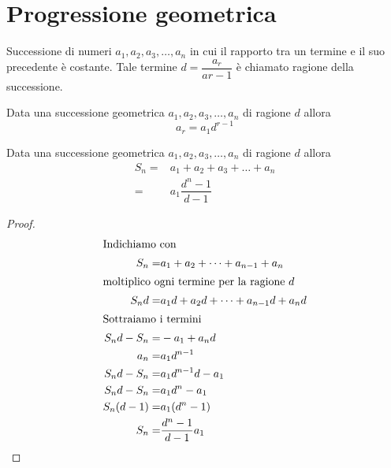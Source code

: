 \section{Progressione geometrica}
\begin{defn}\label{defn:ProgGeom1}
		Successione di numeri $a_1,a_2,a_3,\dots,a_n$ in cui il rapporto tra un termine e il suo precedente è costante. Tale termine $d=\dfrac{a_r}{a{r-1}}$ è chiamato ragione della successione.
\end{defn}
\begin{prop}
	Data una successione geometrica $a_1,a_2,a_3,\dots,a_n$ di ragione $d$ allora\[a_r=a_1d^{r-1}\]
\end{prop}
\begin{thm}\label{thm:SommaProgGeo}
		Data una successione geometrica $a_1,a_2,a_3,\dots,a_n$ di ragione $d$ allora 
		\begin{align*}
			S_n=&a_1+a_2+a_3+\dots+a_n\\
			=&a_1\dfrac{d^n-1}{d-1}
		\end{align*}
\end{thm}
\begin{proof}
\begin{align*}
\intertext{Indichiamo con}
S_n=&a_1+a_2+\dots+a_{n-1}+a_n\\
\intertext{moltiplico ogni termine per la ragione $d$}
S_nd=&a_1d+a_2d+\dots+a_{n-1}d+a_nd\\
\intertext{Sottraiamo i termini}
S_nd-S_n=&-a_1+a_nd\\
a_n=&a_1d^{n-1}\\
S_nd-S_n=&a_1d^{n-1}d-a_1\\
S_nd-S_n=&a_1d^{n}-a_1\\
S_n(d-1)=&a_1(d^{n}-1)\\
S_n=&\dfrac{d^{n}-1}{d-1}a_1\\
\end{align*}
\end{proof}
